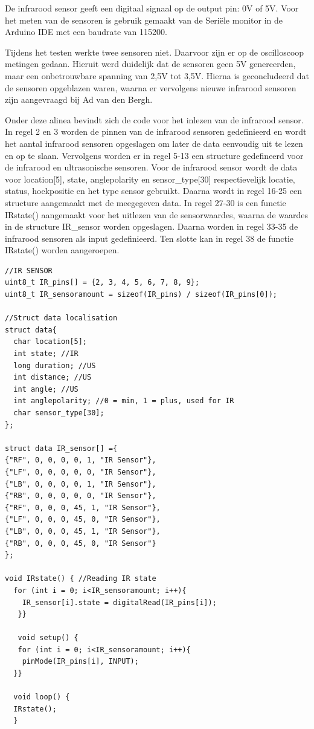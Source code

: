 De infrarood sensor geeft een digitaal signaal op de output pin: 0V of 5V. Voor het meten van de sensoren is gebruik gemaakt van de Seriële monitor in de Arduino IDE met een baudrate van 115200. 

Tijdens het testen werkte twee sensoren niet. Daarvoor zijn er op de oscilloscoop metingen gedaan. Hieruit werd duidelijk dat de sensoren geen 5V genereerden, maar een onbetrouwbare spanning van 2,5V tot 3,5V. Hierna is geconcludeerd dat de sensoren opgeblazen waren, waarna er vervolgens nieuwe infrarood sensoren zijn aangevraagd bij  Ad van den Bergh.

Onder deze alinea bevindt zich de code voor het inlezen van de infrarood sensor. In regel 2 en 3 worden de pinnen van de infrarood sensoren gedefinieerd en wordt het aantal infrarood sensoren opgeslagen om later de data eenvoudig uit te lezen en op te slaan. Vervolgens worden er in regel 5-13 een structure gedefineerd voor de infrarood en ultrasonische sensoren. Voor de infrarood sensor wordt de data voor location[5], state, anglepolarity en sensor\_type[30] respectievelijk locatie, status, hoekpositie en het type sensor gebruikt. Daarna wordt in regel 16-25 een structure aangemaakt met de  meegegeven data. In regel 27-30 is een functie IRstate() aangemaakt voor het uitlezen van de sensorwaardes, waarna de waardes in de structure IR\_sensor worden opgeslagen. Daarna worden in regel 33-35 de infrarood sensoren als input gedefinieerd. Ten slotte kan in regel 38 de functie IRstate() worden aangeroepen.


\begin{lstlisting}
//IR SENSOR
uint8_t IR_pins[] = {2, 3, 4, 5, 6, 7, 8, 9};
uint8_t IR_sensoramount = sizeof(IR_pins) / sizeof(IR_pins[0]);

//Struct data localisation
struct data{
  char location[5];
  int state; //IR
  long duration; //US
  int distance; //US
  int angle; //US
  int anglepolarity; //0 = min, 1 = plus, used for IR
  char sensor_type[30];
};

struct data IR_sensor[] ={
{"RF", 0, 0, 0, 0, 1, "IR Sensor"},
{"LF", 0, 0, 0, 0, 0, "IR Sensor"},
{"LB", 0, 0, 0, 0, 1, "IR Sensor"},
{"RB", 0, 0, 0, 0, 0, "IR Sensor"},
{"RF", 0, 0, 0, 45, 1, "IR Sensor"},
{"LF", 0, 0, 0, 45, 0, "IR Sensor"},
{"LB", 0, 0, 0, 45, 1, "IR Sensor"},
{"RB", 0, 0, 0, 45, 0, "IR Sensor"}
};

void IRstate() { //Reading IR state
  for (int i = 0; i<IR_sensoramount; i++){
    IR_sensor[i].state = digitalRead(IR_pins[i]);
   }}
   
   void setup() {
   for (int i = 0; i<IR_sensoramount; i++){
    pinMode(IR_pins[i], INPUT);
  }}
  
  void loop() {
  IRstate();
  }
\end{lstlisting}
